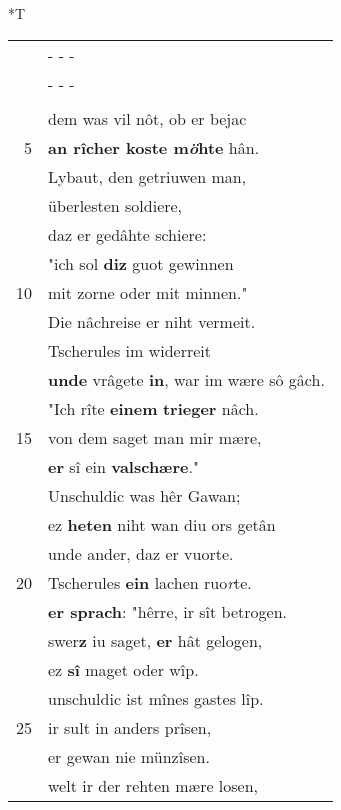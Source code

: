 \documentclass[8pt,a4paper,notitlepage]{article}
\begin{document}
\begin{table}[ht]
\begin{minipage}[t]{0.5\linewidth}
\end{minipage}
\hspace{0.5cm}
\begin{minipage}[t]{0.5\linewidth}
\small
\begin{center}*T
\end{center}
\begin{tabular}{rl}
 & \multicolumn{1}{l}{ - - - }\\ 
 & \multicolumn{1}{l}{ - - - }\\ 
 & \textbf{\begin{large}D\end{large}er} ie urliuges \textbf{gepflac},\\ 
 & dem was vil nôt, ob er bejac\\ 
5 & \textbf{an rîcher koste m\textit{ö}hte} hân.\\ 
 & Lybaut, den getriuwen man,\\ 
 & überlesten soldiere,\\ 
 & daz er gedâhte schiere:\\ 
 & "ich sol \textbf{diz} guot gewinnen\\ 
10 & mit zorne oder mit minnen."\\ 
 & Die nâchreise er niht vermeit.\\ 
 & Tscherules im widerreit\\ 
 & \textbf{unde} vrâgete \textbf{in}, war im wære sô gâch.\\ 
 & "Ich rîte \textbf{einem} \textbf{trieger} nâch.\\ 
15 & von dem saget man mir mære,\\ 
 & \textbf{er} sî ein \textbf{valschære}."\\ 
 & Unschuldic was hêr Gawan;\\ 
 & ez \textbf{heten} niht wan diu ors getân\\ 
 & unde ander, daz er vuorte.\\ 
20 & Tscherules \textbf{ein} lachen ruo\textit{r}te.\\ 
 & \textbf{er sprach}: "hêrre, ir sît betrogen.\\ 
 & swer\textbf{z} iu saget, \textbf{er} hât gelogen,\\ 
 & ez \textbf{sî} maget oder wîp.\\ 
 & unschuldic ist mînes gastes lîp.\\ 
25 & ir sult in anders prîsen,\\ 
 & er gewan nie münzîsen.\\ 
 & welt ir der rehten mære losen,\\ 

\end{tabular}
\end{minipage}
\end{table}
\end{document}
